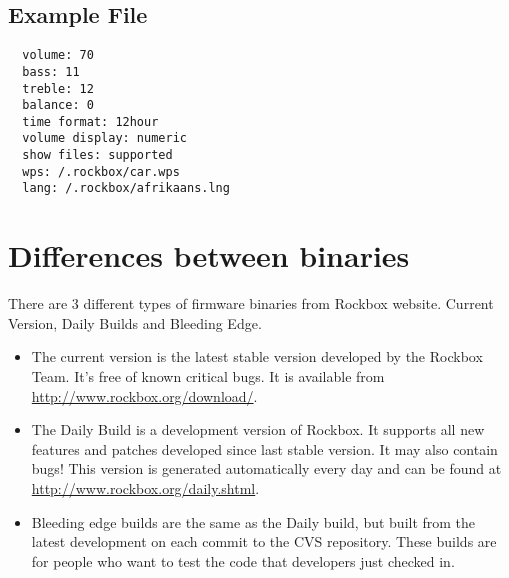 \subsection{Example File}
\begin{verbatim}
  volume: 70
  bass: 11
  treble: 12
  balance: 0
  time format: 12hour
  volume display: numeric
  show files: supported
  wps: /.rockbox/car.wps
  lang: /.rockbox/afrikaans.lng
\end{verbatim}

\section{\label{ref:PartISection1}Differences between binaries}
There are 3 different types of firmware binaries from Rockbox website. Current Version, Daily Builds and Bleeding Edge.

\begin{itemize}
\item The current version is the latest stable version developed by the Rockbox Team. It's free of known critical bugs.  It is available from \url{http://www.rockbox.org/download/}.
\item The Daily Build is a development version of Rockbox. It supports all new features and patches developed since last stable version. It may also contain bugs! This version is generated automatically every day and can be found at \url{http://www.rockbox.org/daily.shtml}.
\item Bleeding edge builds are the same as the Daily build, but built from the latest development on each commit to the CVS repository. These builds are for people who want to test the code that developers just checked in.
\end{itemize}

